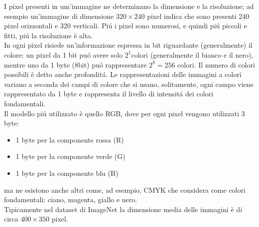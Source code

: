 \documentclass[a4paper,12pt]{report}
\begin{document}
I pixel presenti in um'immagine ne determinano la dimensione e la risoluzione; ad esempio un'immagine di dimensione $320 \times 240$ pixel indica che sono presenti 240 pixel orizzontali e 320 verticali. Pi\'{u} i pixel sono numerosi, e quindi pi\'{u} piccoli e fitti, pi\'{u} la risoluzione \`e alta.\\
In ogni pixel risiede un'informazione espressa in bit riguardante (generalmente) il colore: un pixel da 1 bit pu\'{o} avere solo $2^1$colori (generalmente il bianco e il nero), mentre uno da 1 byte (8bit)  pu\'{o} rappresentare $2^8=256$ colori. Il numero di colori possibili \`e detto anche profondit\'{a}. Le rappresentazioni delle immagini a colori variano a seconda dei campi di colore che si usano, solitamente, ogni campo viene rappresentato da 1 byte e rappresenta il livello di intensit\'{a} dei colori fondamentali.\\
Il modello pi\'{u} utilizzato \`e quello RGB, dove per ogni pixel vengono utilizzati 3 byte:
\begin{itemize}
\item 1 byte per la componente rossa (R)
\item 1 byte per la componente verde (G)
\item 1 byte per la componente blu (B)
\end{itemize}
ma ne esistono anche altri come, ad esempio, CMYK che considera come colori fondamentali: ciano, magenta, giallo e nero.\\
Tipicamente nel dataset di ImageNet la dimensione media delle immagini \`e di circa $400 \times 350$ pixel.
\end{document}
